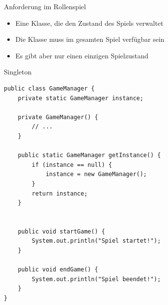 
\begin{frame}{Anforderung im Rollenspiel}
	\begin{itemize}
 		\item Eine Klasse, die den Zustand des Spiels verwaltet
 		\item Die Klasse muss im gesamten Spiel verfügbar sein
 		\item Es gibt aber nur einen einzigen Spielzustand
 	\end{itemize}
\end{frame}

\begin{frame}[fragile]{Singleton}
	\begin{exampleblock}{}
		\begin{lstlisting}
public class GameManager {
    private static GameManager instance;

    private GameManager() {
        // ...
    }

    public static GameManager getInstance() {
        if (instance == null) {
            instance = new GameManager();
        }
        return instance;
    }
    

    public void startGame() {
    	System.out.println("Spiel startet!");
    }

    public void endGame() {
        System.out.println("Spiel beendet!");
    }
}
	 	\end{lstlisting}
 	\end{exampleblock}
\end{frame}

